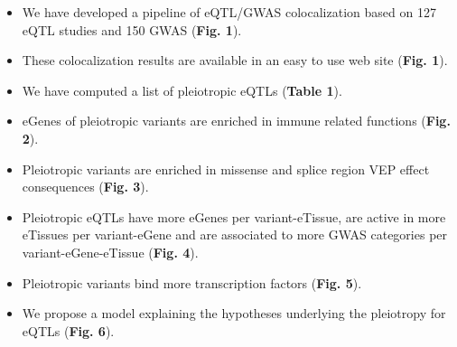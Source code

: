 \documentclass[portrait,a0b,final]{a0poster}
\newenvironment{poster}{
	  \begin{center}
	  \begin{minipage}[c]{0.98\textwidth}
	}{
	  \end{minipage} 
	  \end{center}
	}
\begin{document}
\begin{poster}
\begin{multicols}{2}
	\begin{itemize}	
	\item We have developed a pipeline of eQTL/GWAS colocalization based on 127 eQTL studies and 150 GWAS (\textbf{Fig. 1}).
	\item These colocalization results are available in an easy to use web site (\textbf{Fig. 1}).
	\item We have computed a list of pleiotropic eQTLs (\textbf{Table 1}).
	\item eGenes of pleiotropic variants are enriched in immune related functions (\textbf{Fig. 2}).
	\item Pleiotropic variants are enriched in missense and splice region VEP effect consequences (\textbf{Fig. 3}).
	\item Pleiotropic eQTLs have more eGenes per variant-eTissue, are active in more eTissues per variant-eGene and are associated to more GWAS categories per variant-eGene-eTissue (\textbf{Fig. 4}).
	\item Pleiotropic variants bind more transcription factors (\textbf{Fig. 5}).
	\item We propose a model explaining the hypotheses underlying the pleiotropy for eQTLs (\textbf{Fig. 6}).
	\end{itemize}
	
	\normalsize
	
	
	
	\end{multicols}
	
	
	\end{poster}
	
	
\end{document}
